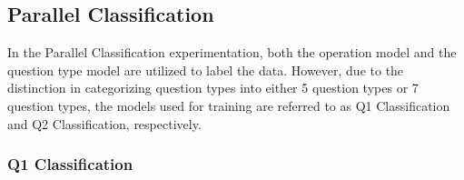 \documentclass[12pt,oneside,openright,a4paper]{cpe-english-project}
\begin{document}
    \subsection{Parallel  Classification}
      \qquad In the Parallel Classification experimentation, both the operation model and the question type model are utilized to label the data. However, due to the distinction in categorizing question types into either 5 question types or 7 question types, the models used for training are referred to as Q1 Classification and Q2 Classification, respectively. \par
      \subsubsection{Q1 Classification}
        \begin{table}
          \scriptsize
          \centering
          \caption{Q1 Classification with Added Normal and Augmented Experiment Result}
\end{table}
\end{document}
